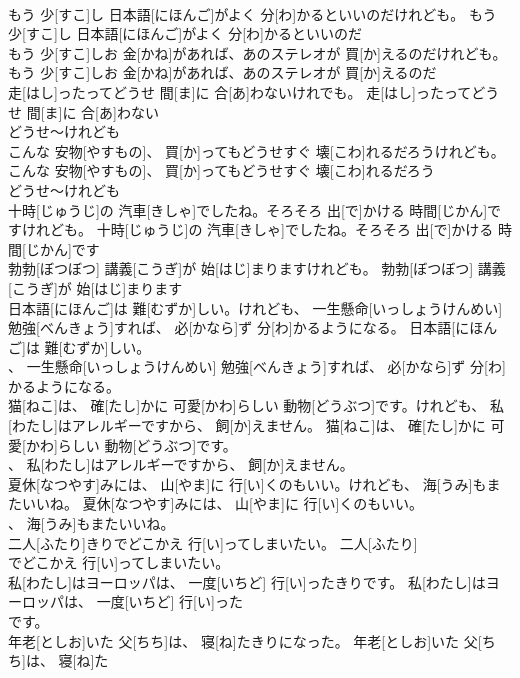 \documentclass[8pt]{extreport}
\begin{document}
\begin{CJK}{UTF8}{min}
\\	もう 少[すこ]し 日本語[にほんご]がよく 分[わ]かるといいのだけれども。	もう 少[すこ]し 日本語[にほんご]がよく 分[わ]かるといいのだ
\\	もう 少[すこ]しお 金[かね]があれば、あのステレオが 買[か]えるのだけれども。	もう 少[すこ]しお 金[かね]があれば、あのステレオが 買[か]えるのだ
\\	走[はし]ったってどうせ 間[ま]に 合[あ]わないけれでも。	走[はし]ったってどうせ 間[ま]に 合[あ]わない
\\	どうせ～けれども
\\	こんな 安物[やすもの]、 買[か]ってもどうせすぐ 壊[こわ]れるだろうけれども。	こんな 安物[やすもの]、 買[か]ってもどうせすぐ 壊[こわ]れるだろう
\\	どうせ～けれども
\\	十時[じゅうじ]の 汽車[きしゃ]でしたね。そろそろ 出[で]かける 時間[じかん]ですけれども。	十時[じゅうじ]の 汽車[きしゃ]でしたね。そろそろ 出[で]かける 時間[じかん]です
\\	勃勃[ぼつぼつ] 講義[こうぎ]が 始[はじ]まりますけれども。	勃勃[ぼつぼつ] 講義[こうぎ]が 始[はじ]まります
\\	日本語[にほんご]は 難[むずか]しい。けれども、 一生懸命[いっしょうけんめい] 勉強[べんきょう]すれば、 必[かなら]ず 分[わ]かるようになる。	日本語[にほんご]は 難[むずか]しい。
\\	、 一生懸命[いっしょうけんめい] 勉強[べんきょう]すれば、 必[かなら]ず 分[わ]かるようになる。	
\\	猫[ねこ]は、 確[たし]かに 可愛[かわ]らしい 動物[どうぶつ]です。けれども、 私[わたし]はアレルギーですから、 飼[か]えません。	猫[ねこ]は、 確[たし]かに 可愛[かわ]らしい 動物[どうぶつ]です。
\\	、 私[わたし]はアレルギーですから、 飼[か]えません。	
\\	夏休[なつやす]みには、 山[やま]に 行[い]くのもいい。けれども、 海[うみ]もまたいいね。	夏休[なつやす]みには、 山[やま]に 行[い]くのもいい。
\\	、 海[うみ]もまたいいね。	
\\	二人[ふたり]きりでどこかえ 行[い]ってしまいたい。	二人[ふたり]
\\	でどこかえ 行[い]ってしまいたい。	
\\	私[わたし]はヨーロッパは、 一度[いちど] 行[い]ったきりです。	私[わたし]はヨーロッパは、 一度[いちど] 行[い]った
\\	です。	
\\	年老[としお]いた 父[ちち]は、 寝[ね]たきりになった。	年老[としお]いた 父[ちち]は、 寝[ね]た

\end{CJK}
\end{document}
